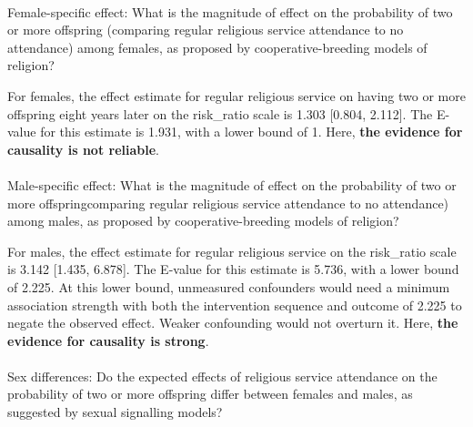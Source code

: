 \documentclass[
  single column]{article}
\makeatletter
\let\oldparagraph\paragraph
\renewcommand{\paragraph}{
    \@ifstar
      \xxxParagraphStar
      \xxxParagraphNoStar
  }
\newcommand{\xxxParagraphStar}[1]{\oldparagraph*{#1}\mbox{}}
\newcommand{\xxxParagraphNoStar}[1]{\oldparagraph{#1}\mbox{}}
\makeatother
\begin{document}
\paragraph{Female-specific effect: What is the magnitude of effect on
the probability of two or more offspring (comparing regular religious
service attendance to no attendance) among females, as proposed by
cooperative-breeding models of
religion?}\label{female-specific-effect-what-is-the-magnitude-of-effect-on-the-probability-of-two-or-more-offspring-comparing-regular-religious-service-attendance-to-no-attendance-among-females-as-proposed-by-cooperative-breeding-models-of-religion}

For females, the effect estimate for regular religious service on having
two or more offspring eight years later on the risk\_ratio scale is
1.303 {[}0.804, 2.112{]}. The E-value for this estimate is 1.931, with a
lower bound of 1. Here, \textbf{the evidence for causality is not
reliable}.

\paragraph{Male-specific effect: What is the magnitude of effect on the
probability of two or more offspringcomparing regular religious service
attendance to no attendance) among males, as proposed by
cooperative-breeding models of
religion?}\label{male-specific-effect-what-is-the-magnitude-of-effect-on-the-probability-of-two-or-more-offspringcomparing-regular-religious-service-attendance-to-no-attendance-among-males-as-proposed-by-cooperative-breeding-models-of-religion}

For males, the effect estimate for regular religious service on the
risk\_ratio scale is 3.142 {[}1.435, 6.878{]}. The E-value for this
estimate is 5.736, with a lower bound of 2.225. At this lower bound,
unmeasured confounders would need a minimum association strength with
both the intervention sequence and outcome of 2.225 to negate the
observed effect. Weaker confounding would not overturn it. Here,
\textbf{the evidence for causality is strong}.

\paragraph{Sex differences: Do the expected effects of religious service
attendance on the probability of two or more offspring differ between
females and males, as suggested by sexual signalling
models?}\label{sex-differences-do-the-expected-effects-of-religious-service-attendance-on-the-probability-of-two-or-more-offspring-differ-between-females-and-males-as-suggested-by-sexual-signalling-models}
\end{document}
